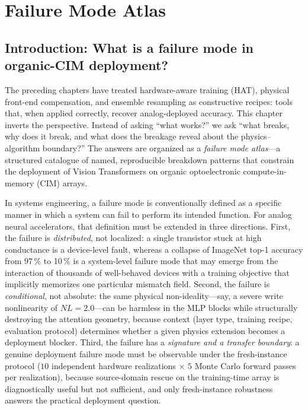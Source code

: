 \chapter{Failure Mode Atlas}
\label{chap:failure-mode-atlas}

\section{Introduction: What is a failure mode in organic-CIM deployment?}

The preceding chapters have treated hardware-aware training (HAT), physical front-end compensation, and ensemble resampling as constructive recipes: tools that, when applied correctly, recover analog-deployed accuracy.  This chapter inverts the perspective.  Instead of asking ``what works?'' we ask ``what breaks, why does it break, and what does the breakage reveal about the physics--algorithm boundary?''  The answers are organized as a \emph{failure mode atlas}---a structured catalogue of named, reproducible breakdown patterns that constrain the deployment of Vision Transformers on organic optoelectronic compute-in-memory (CIM) arrays.

In systems engineering, a failure mode is conventionally defined as a specific manner in which a system can fail to perform its intended function.  For analog neural accelerators, that definition must be extended in three directions.  First, the failure is \emph{distributed}, not localized: a single transistor stuck at high conductance is a device-level fault, whereas a collapse of ImageNet top-1 accuracy from 97\,\% to 10\,\% is a system-level failure mode that may emerge from the interaction of thousands of well-behaved devices with a training objective that implicitly memorizes one particular mismatch field.  Second, the failure is \emph{conditional}, not absolute: the same physical non-ideality---say, a severe write nonlinearity of $NL=2.0$---can be harmless in the MLP blocks while structurally destroying the attention geometry, because context (layer type, training recipe, evaluation protocol) determines whether a given physics extension becomes a deployment blocker.  Third, the failure has a \emph{signature and a transfer boundary}: a genuine deployment failure mode must be observable under the fresh-instance protocol ($10$ independent hardware realizations $\times$ $5$ Monte Carlo forward passes per realization), because source-domain rescue on the training-time array is diagnostically useful but not sufficient, and only fresh-instance robustness answers the practical deployment question.

